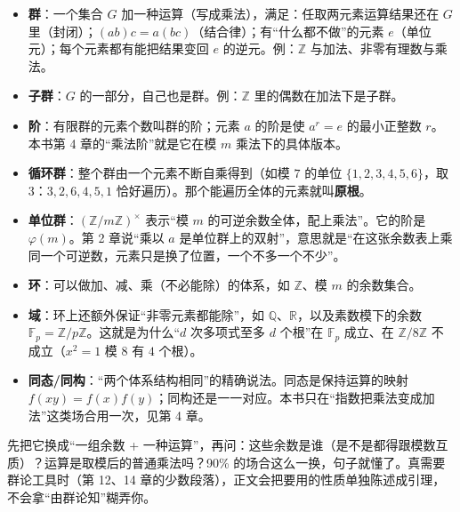 \documentclass[UTF8,a4paper,11pt,twoside,openright,fontset=fandol]{ctexbook}
\theoremstyle{definition}
\newcommand{\Z}{\mathbb Z}
\begin{document}
\begin{itemize}
\item \textbf{群}：一个集合 $G$ 加一种运算（写成乘法），满足：任取两元素运算结果还在 $G$ 里（封闭）；$(ab)c=a(bc)$（结合律）；有“什么都不做”的元素 $e$（单位元）；每个元素都有能把结果变回 $e$ 的逆元。例：$\Z$ 与加法、非零有理数与乘法。
\item \textbf{子群}：$G$ 的一部分，自己也是群。例：$\Z$ 里的偶数在加法下是子群。
\item \textbf{阶}：有限群的元素个数叫群的阶；元素 $a$ 的阶是使 $a^r=e$ 的最小正整数 $r$。本书第 4 章的“乘法阶”就是它在模 $m$ 乘法下的具体版本。
\item \textbf{循环群}：整个群由一个元素不断自乘得到（如模 $7$ 的单位 $\{1,2,3,4,5,6\}$，取 $3$：$3,2,6,4,5,1$ 恰好遍历）。那个能遍历全体的元素就叫\textbf{原根}。
\item \textbf{单位群}：$(\Z/m\Z)^{\times}$ 表示“模 $m$ 的可逆余数全体，配上乘法”。它的阶是 $\varphi(m)$。第 2 章说“乘以 $a$ 是单位群上的双射”，意思就是“在这张余数表上乘同一个可逆数，元素只是换了位置，一个不多一个不少”。
\item \textbf{环}：可以做加、减、乘（不必能除）的体系，如 $\Z$、模 $m$ 的余数集合。
\item \textbf{域}：环上还额外保证“非零元素都能除”，如 $\mathbb Q$、$\mathbb R$，以及素数模下的余数 $\mathbb F_p=\Z/p\Z$。这就是为什么“$d$ 次多项式至多 $d$ 个根”在 $\mathbb F_p$ 成立、在 $\Z/8\Z$ 不成立（$x^2=1$ 模 $8$ 有 $4$ 个根）。
\item \textbf{同态/同构}：“两个体系结构相同”的精确说法。同态是保持运算的映射 $f(xy)=f(x)f(y)$；同构还是一一对应。本书只在“指数把乘法变成加法”这类场合用一次，见第 4 章。
\end{itemize}

\begin{tip}[遇到“群”字时的实用策略]
先把它换成“一组余数 + 一种运算”，再问：这些余数是谁（是不是都得跟模数互质）？运算是取模后的普通乘法吗？90\% 的场合这么一换，句子就懂了。真需要群论工具时（第 12、14 章的少数段落），正文会把要用的性质单独陈述成引理，不会拿“由群论知”糊弄你。
\end{tip}
\end{document}
